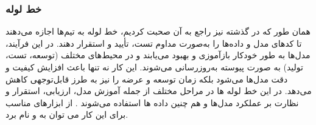 \subsubsection{خط لوله }
همان طور که در گذشته نیز راجع به آن صحبت کردیم، خط لوله  به تیم‌ها اجازه می‌دهند تا کدهای مدل و داده‌ها را به‌صورت مداوم تست، تأیید و استقرار دهند. در این فرآیند، مدل‌ها به طور خودکار بازآموزی و بهبود می‌یابند و در محیط‌های مختلف (توسعه، تست، تولید) به صورت پیوسته به‌روزرسانی می‌شوند. این کار نه تنها باعث افزایش کیفیت و دقت مدل‌ها می‌شود بلکه زمان توسعه و عرضه را نیز به طرز قابل‌توجهی کاهش می‌دهد. در  این خط لوله ‌ها در مراحل مختلف از جمله آموزش مدل، ارزیابی، استقرار و نظارت بر عملکرد مدل‌ها و هم چنین داده ها استفاده می‌شوند \cite{MLOpsProd2}. از ابزارهای مناسب برای این کار می توان به \cite{Jenkins} و \cite{GitLab} نام برد. 




































